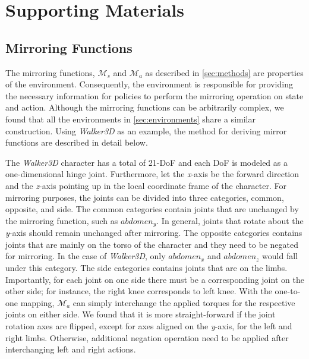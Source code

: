 \chapter{Supporting Materials}



\section{Mirroring Functions}
\label{sec:mirroring-functions}

The mirroring functions, $\mathcal{M}_s$ and $\mathcal{M}_a$ as described in \autoref{sec:methods} are properties of the environment.  Consequently, the environment is responsible for providing the necessary information for policies to perform the mirroring operation on state and action.  Although the mirroring functions can be arbitrarily complex, we found that all the environments in \autoref{sec:environments} share a similar construction.  Using \textit{Walker3D} as an example, the method for deriving mirror functions are described in detail below.

The \textit{Walker3D} character has a total of 21-DoF and each DoF is modeled as a one-dimensional hinge joint.  Furthermore, let the \textit{x}-axis be the forward direction and the \textit{z}-axis pointing up in the local coordinate frame of the character.  For mirroring purposes, the joints can be divided into three categories, common, opposite, and side.  The common categories contain joints that are unchanged by the mirroring function, such as $abdomen_y$.  In general, joints that rotate about the \textit{y}-axis should remain unchanged after mirroring.  The opposite categories contains joints that are mainly on the torso of the character and they need to be negated for mirroring.  In the case of \textit{Walker3D}, only $abdomen_x$ and $abdomen_z$ would fall under this category.  The side categories contains joints that are on the limbs.  Importantly, for each joint on one side there must be a corresponding joint on the other side; for instance, the right knee corresponds to left knee.  With the one-to-one mapping, $\mathcal{M}_a$ can simply interchange the applied torques for the respective joints on either side.  We found that it is more straight-forward if the joint rotation axes are flipped, except for axes aligned on the  \textit{y}-axis, for the left and right limbs.  Otherwise, additional negation operation need to be applied after interchanging left and right actions. 

